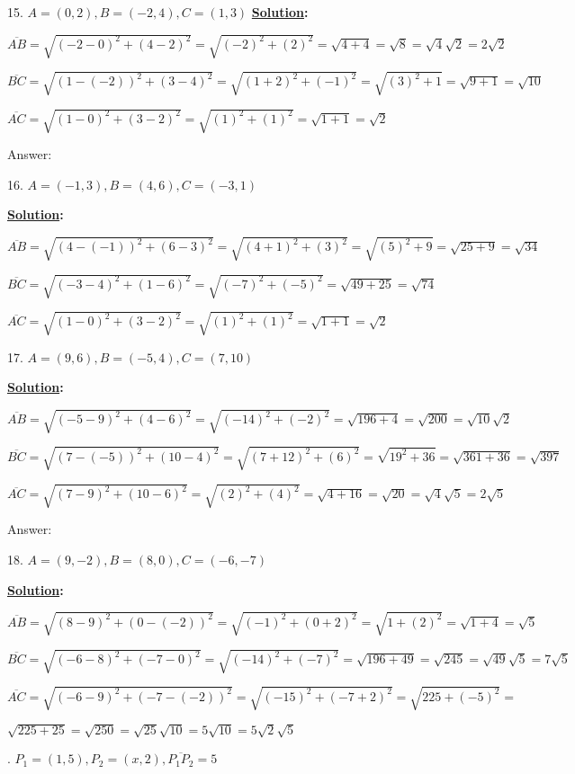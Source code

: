 \documentclass[10pt,letterpaper]{article}
\begin{document}
15. $A=(0, 2), B=(-2, 4), C=(1, 3)$
\textbf{\underline {Solution}:}

$\overline{AB} =\sqrt{(-2-0)^2+(4-2)^2}=\sqrt{(-2)^2+(2)^2}=\sqrt{4+4}=\sqrt{8}=\sqrt{4}\sqrt{2}=2\sqrt{2}$

$\overline{BC} =\sqrt{(1-(-2))^2+(3-4)^2}=\sqrt{(1+2)^2+(-1)^2}=\sqrt{(3)^2+1}=\sqrt{9+1}=\sqrt{10}$

$\overline{AC} =\sqrt{(1-0)^2+(3-2)^2}=\sqrt{(1)^2+(1)^2}=\sqrt{1+1}=\sqrt{2}$

\color{amethyst}Answer: \color{green}{Right Triangle}\color{black}

16. $A=(-1, 3), B=(4, 6), C=(-3, 1)$

\textbf{\underline {Solution}:}

$\overline{AB} =\sqrt{(4-(-1))^2+(6-3)^2}=\sqrt{(4+1)^2+(3)^2}=\sqrt{(5)^2+9}=\sqrt{25+9}=\sqrt{34}$

$\overline{BC} =\sqrt{(-3-4)^2+(1-6)^2}=\sqrt{(-7)^2+(-5)^2}=\sqrt{49+25}=\sqrt{74}$

$\overline{AC} =\sqrt{(1-0)^2+(3-2)^2}=\sqrt{(1)^2+(1)^2}=\sqrt{1+1}=\sqrt{2}$

17. $A=(9, 6), B=(-5, 4), C=(7, 10)$

\textbf{\underline {Solution}:}

$\overline{AB} =\sqrt{(-5-9)^2+(4-6)^2}=\sqrt{(-14)^2+(-2)^2}=\sqrt{196+4}=\sqrt{200}=\sqrt{10}\sqrt{2}$

$\overline{BC} =\sqrt{(7-(-5))^2+(10-4)^2}=\sqrt{(7+12)^2+(6)^2}=\sqrt{19^2+36}=\sqrt{361+36}=\sqrt{397}$

$\overline{AC} =\sqrt{(7-9)^2+(10-6)^2}=\sqrt{(2)^2+(4)^2}=\sqrt{4+16}=\sqrt{20}=\sqrt{4}\sqrt{5}=2\sqrt{5}$

\color{amethyst}Answer: \color{green}{Right Triangle}\color{black}

18. $A=(9, -2), B=(8, 0), C=(-6, -7)$

\textbf{\underline {Solution}:}

$\overline{AB} =\sqrt{(8-9)^2+(0-(-2))^2}=\sqrt{(-1)^2+(0+2)^2}=\sqrt{1+(2)^2}=\sqrt{1+4}=\sqrt{5}$

$\overline{BC} =\sqrt{(-6-8)^2+(-7-0)^2}=\sqrt{(-14)^2+(-7)^2}=\sqrt{196+49}=\sqrt{245}=\sqrt{49}\sqrt{5}=7\sqrt{5}$

$\overline{AC} =\sqrt{(-6-9)^2+(-7-(-2))^2}=\sqrt{(-15)^2+(-7+2)^2}=\sqrt{225+(-5)^2}=$

$\sqrt{225+25}=\sqrt{250}=\sqrt{25}\sqrt{10}=5\sqrt{10}=5\sqrt{2}\sqrt{5}$

. $P_{1} = (1, 5), P_{2} = (x, 2), \overline{P_1P_2} = 5$
\end{document}
